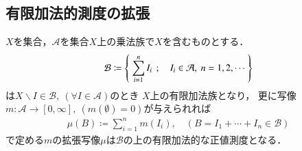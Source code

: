 	\subsection{有限加法的測度の拡張}
		\begin{screen}
			\begin{thm}[有限加法的な正値測度空間の生成]\label{thm:forming_finitely_additive_class}
				$X$を集合，$\mathcal{A}$を集合$X$上の乗法族で$X$を含むものとする．
				\begin{align}
					\mathcal{B} \coloneqq \left\{\ \sum_{i=1}^n I_i\ \, ; \quad I_i \in \mathcal{A},\ n=1,2,\cdots\ \right\}
				\end{align}
				は$X\backslash I \in \mathcal{B},\ (\forall I \in \mathcal{A})$のとき
				$X$上の有限加法族となり，
				更に写像$m:\mathcal{A} \longrightarrow [0,\infty],\ (m(\emptyset)=0)$が与えられれば
				\begin{align}
					\mu(B) \coloneqq \sum_{i=1}^n m(I_i),
					\quad (B=I_1 + \cdots + I_n \in \mathcal{B})
				\end{align}
				で定める$m$の拡張写像$\mu$は$\mathcal{B}$の上の有限加法的な正値測度となる．
			\end{thm}
		\end{screen}
		
